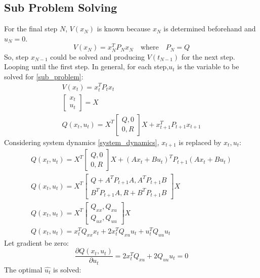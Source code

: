 \documentclass{article}
\begin{document}
\subsection{Sub Problem Solving}
For the final step $N$, $V(x_N)$ is known because $x_N$ is determined beforehand and $u_N=0$.
\begin{equation}
    V(x_N) = x_N^T P_N x_N \quad \text{where} \quad P_N = Q
\end{equation}
So, step $x_{N-1}$ could be solved and producing $V(t_{N-1})$ for the next step. Looping until the first step. In general, for each step,$u_t$ is the variable to be solved for \eqref{sub_problem}:
\begin{gather}
    V(x_t) = x_t^T P_t x_t\\
    \begin{bmatrix}
        x_t\\
        u_t
    \end{bmatrix} = X\\
    Q(x_t, u_t) = X^T\begin{bmatrix}Q, 0 \\ 0, R \end{bmatrix}X + x_{t+1}^T P_{t+1} x_{t+1}
\end{gather}
Considering system dynamics \eqref{system_dynamics}, $x_{t+1}$ is replaced by $x_t, u_t$:
\begin{gather}
    Q(x_t, u_t) = X^T\begin{bmatrix}Q, 0 \\ 0, R \end{bmatrix}X + (A x_t + B u_t)^T P_{t+1} (A x_t + B u_t)\\
    Q(x_t, u_t) = X^T\begin{bmatrix}Q+A^T P_{t+1} A, A^T P_{t+1} B \\ B^T P_{t+1} A, R + B^T P_{t+1} B \end{bmatrix}X\\
    Q(x_t, u_t) =X^T\begin{bmatrix}Q_{xx}, Q_{xu} \\ Q_{ux}, Q_{uu} \end{bmatrix}X\label{q_value_function}\\
    Q(x_t, u_t) = x_t^T Q_{xx} x_t + 2x_t^TQ_{xu} u_t + u_t^T Q_{uu} u_t
\end{gather}
Let gradient be zero:
\begin{equation}
    \frac{\partial{Q(x_t, u_t)}}{\partial{u_t}} = 2x_t^TQ_{xu} + 2Q_{uu} u_t = 0
\end{equation}
The optimal $\hat{u_t}$ is solved:
\end{document}
